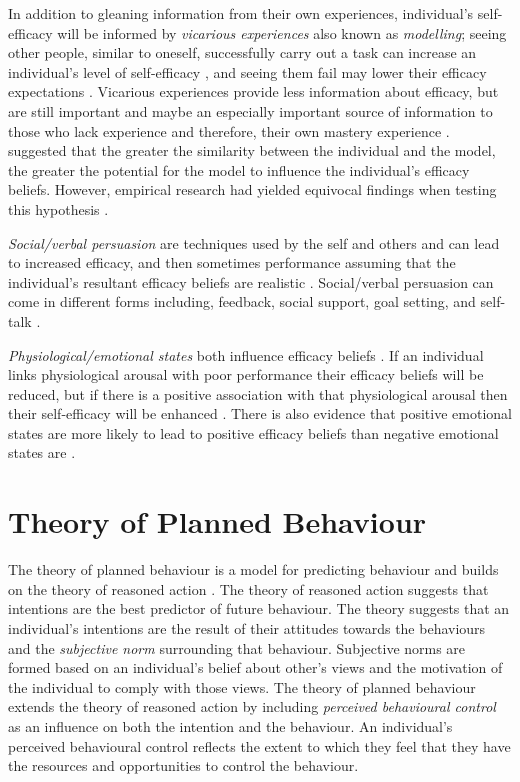 \documentclass[
  12pt,
  a4paper,
]{book}
\begin{document}
In addition to gleaning information from their own experiences, individual's self-efficacy will be informed by \emph{vicarious experiences} also known as \emph{modelling}; seeing other people, similar to oneself, successfully carry out a task can increase an individual's level of self-efficacy \citep{Bandura1982, Lirgg1991}, and seeing them fail may lower their efficacy expectations \citep{Brown1978}. Vicarious experiences provide less information about efficacy, but are still important \citep{McCullagh2001} and maybe an especially important source of information to those who lack experience and therefore, their own mastery experience \citep{Weinberg2014}. \citet{Bandura1986} suggested that the greater the similarity between the individual and the model, the greater the potential for the model to influence the individual's efficacy beliefs. However, empirical research had yielded equivocal findings when testing this hypothesis \citep[cf.~][]{Samson2011}.

\emph{Social/verbal persuasion} are techniques used by the self and others and can lead to increased efficacy, and then sometimes performance assuming that the individual's resultant efficacy beliefs are realistic \citep{Bandura1982}. Social/verbal persuasion can come in different forms including, feedback, social support, goal setting, and self-talk \citep{Samson2011}.

\emph{Physiological/emotional states} both influence efficacy beliefs \citep{Bandura1977, Bandura1982}. If an individual links physiological arousal with poor performance their efficacy beliefs will be reduced, but if there is a positive association with that physiological arousal then their self-efficacy will be enhanced \citep{Hauck2008, Jones1995, Jones1992}. There is also evidence that positive emotional states are more likely to lead to positive efficacy beliefs than negative emotional states are \citep{Maddux1995, Martin2002}.

\hypertarget{gen-intro-social-tpb}{%
\section{Theory of Planned Behaviour}\label{gen-intro-social-tpb}}

The theory of planned behaviour \citep{Ajzen1991, Ajzen1986} is a model for predicting behaviour and builds on the theory of reasoned action \citep{Ajzen1980}. The theory of reasoned action suggests that intentions are the best predictor of future behaviour. The theory suggests that an individual's intentions are the result of their attitudes towards the behaviours and the \emph{subjective norm} surrounding that behaviour. Subjective norms are formed based on an individual's belief about other's views and the motivation of the individual to comply with those views. The theory of planned behaviour extends the theory of reasoned action by including \emph{perceived behavioural control} as an influence on both the intention and the behaviour. An individual's perceived behavioural control reflects the extent to which they feel that they have the resources and opportunities to control the behaviour.
\end{document}
